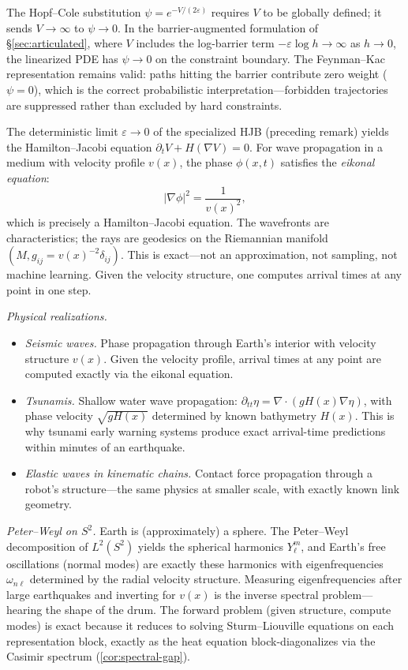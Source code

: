\begin{remark}\label{rem:hopf-cole-barrier}
The Hopf--Cole substitution $\psi = e^{-V/(2\varepsilon)}$ requires $V$ to be globally defined; it sends $V \to \infty$ to $\psi \to 0$. In the barrier-augmented formulation of \S\ref{sec:articulated}, where $V$ includes the log-barrier term $-\varepsilon\log h \to \infty$ as $h \to 0$, the linearized PDE has $\psi \to 0$ on the constraint boundary. The Feynman--Kac representation remains valid: paths hitting the barrier contribute zero weight ($\psi = 0$), which is the correct probabilistic interpretation---forbidden trajectories are suppressed rather than excluded by hard constraints.
\end{remark}

\begin{remark}\label{rem:eikonal}
The deterministic limit $\varepsilon \to 0$ of the specialized HJB (preceding remark) yields the Hamilton--Jacobi equation $\partial_t V + H(\nabla V) = 0$. For wave propagation in a medium with velocity profile $v(x)$, the phase $\phi(x,t)$ satisfies the \emph{eikonal equation}:
\[
|\nabla\phi|^2 = \frac{1}{v(x)^2},
\]
which is precisely a Hamilton--Jacobi equation. The wavefronts are characteristics; the rays are geodesics on the Riemannian manifold $(M, g_{ij} = v(x)^{-2}\delta_{ij})$. This is exact---not an approximation, not sampling, not machine learning. Given the velocity structure, one computes arrival times at any point in one step.

\emph{Physical realizations.}
\begin{itemize}
\item \emph{Seismic waves.} Phase propagation through Earth's interior with velocity structure $v(x)$. Given the velocity profile, arrival times at any point are computed exactly via the eikonal equation.
\item \emph{Tsunamis.} Shallow water wave propagation: $\partial_{tt}\eta = \nabla\cdot(gH(x)\nabla\eta)$, with phase velocity $\sqrt{gH(x)}$ determined by known bathymetry $H(x)$. This is why tsunami early warning systems produce exact arrival-time predictions within minutes of an earthquake.
\item \emph{Elastic waves in kinematic chains.} Contact force propagation through a robot's structure---the same physics at smaller scale, with exactly known link geometry.
\end{itemize}

\emph{Peter--Weyl on $S^2$.}
Earth is (approximately) a sphere. The Peter--Weyl decomposition of $L^2(S^2)$ yields the spherical harmonics $Y_\ell^m$, and Earth's free oscillations (normal modes) are exactly these harmonics with eigenfrequencies $\omega_{n\ell}$ determined by the radial velocity structure. Measuring eigenfrequencies after large earthquakes and inverting for $v(x)$ is the inverse spectral problem---hearing the shape of the drum. The forward problem (given structure, compute modes) is exact because it reduces to solving Sturm--Liouville equations on each representation block, exactly as the heat equation block-diagonalizes via the Casimir spectrum (\cref{cor:spectral-gap}).


\end{remark}
